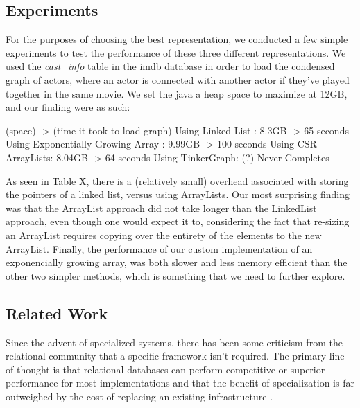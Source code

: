 \documentclass[11pt,letterpaper]{article}
\begin{document}
\subsection*{Experiments}
For the purposes of choosing the best representation, we conducted a few simple experiments to test the performance of these three different representations. We used the \textit{cast\_info} table in the imdb database in order to load the condensed graph of actors, where an actor is connected with another actor if they've played together in the same movie. We set the java a heap space to maximize at 12GB, and our finding were as such:

 (space) -> (time it took to load graph)
Using Linked List : 8.3GB -> 65 seconds
Using Exponentially Growing Array : 9.99GB -> 100 seconds
Using CSR ArrayLists: 8.04GB -> 64 seconds
Using TinkerGraph: (?) Never Completes

As seen in Table X, there is a (relatively small) overhead  associated with storing the pointers of a linked list, versus using ArrayLists. Our most surprising finding was that the ArrayList approach did not take longer than the LinkedList approach, even though one would expect it to, considering the fact that re-sizing an ArrayList requires copying over the entirety of the elements to the new ArrayList. Finally, the performance of our custom implementation of an exponencially growing array, was both slower and less memory efficient than the other two simpler methods, which is something that we need to further explore.

\subsection*{Related Work}

Since the advent of specialized systems, there has been some criticism from the relational community that a specific-framework isn't required. The primary line of thought is that relational databases can perform competitive or superior performance for most implementations and that the benefit of specialization is far outweighed by the cost of replacing an existing infrastructure \cite{welc_graph_2013}.
\end{document}
